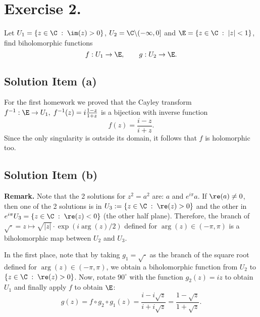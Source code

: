 
\section{Exercise 2.}

Let $U_1 = \{z\in \C \;:\; \im(z) > 0\}$, $U_2 = \C \backslash (-\infty,0]$ and $\E = \{z \in \C \;:\; |z| < 1\}$, find biholomorphic functions
\[ f : U_1 \to \E,\hspace{2em} g: U_2 \to \E. \]

\subsection*{Solution Item (a)}

For the first homework we proved that the Cayley transform $f^{-1}: \E \to U_1,\; f^{-1}(z) = i\frac{1-z}{1+z}$ is a bijection with inverse function
\[ f(z) = \frac{i-z}{i+z}. \]
Since the only singularity is outside its domain, it follows that $f$ is holomorphic too.

\subsection*{Solution Item (b)}
\textbf{Remark.} Note that the 2 solutions for $z^2 = a^2$ are: $a$ and $e^{i\pi}a$. If $\re(a) \neq 0$, then one of the 2 solutions is in $U_3 :=\{z\in\C \;:\; \re(z) > 0\}$ and the other in $e^{i\pi} U_3 = \{z\in\C \;:\; \re(z) < 0\}$ (the other half plane). Therefore, the branch of $\sqrt{\cdot} = z\mapsto \sqrt{|z|} \cdot \exp(i \arg(z)/2)$ defined for $\arg(z) \in (-\pi,\pi)$ is a biholomorphic map between $U_2$ and $U_3$.

In the first place, note that by taking $g_1 = \sqrt{\cdot}$ as the branch of the square root defined for $\arg(z) \in (-\pi,\pi)$, we obtain a biholomorphic function from $U_2$ to $\{z \in \C \;:\; \re(z) > 0\}$. Now, rotate $90^\circ$ with the function $g_2(z) = iz$ to obtain $U_1$ and finally apply $f$ to obtain $\E$:
\[ g(z) = f\circ g_2 \circ g_1(z) = \frac{i-i\sqrt{z}}{i+i\sqrt{z}} = \frac{1-\sqrt{z}}{1+\sqrt{z}}. \]